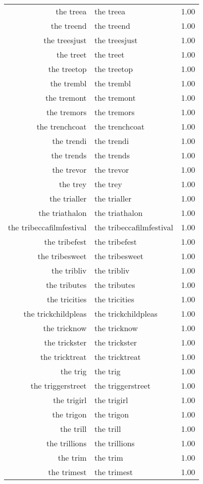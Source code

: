 \begin{table}[ht]
\begin{tabular}{rlr}
  the treea & the treea & 1.00 \\ 
  the treend & the treend & 1.00 \\ 
  the treesjust & the treesjust & 1.00 \\ 
  the treet & the treet & 1.00 \\ 
  the treetop & the treetop & 1.00 \\ 
  the trembl & the trembl & 1.00 \\ 
  the tremont & the tremont & 1.00 \\ 
  the tremors & the tremors & 1.00 \\ 
  the trenchcoat & the trenchcoat & 1.00 \\ 
  the trendi & the trendi & 1.00 \\ 
  the trends & the trends & 1.00 \\ 
  the trevor & the trevor & 1.00 \\ 
  the trey & the trey & 1.00 \\ 
  the trialler & the trialler & 1.00 \\ 
  the triathalon & the triathalon & 1.00 \\ 
  the tribeccafilmfestival & the tribeccafilmfestival & 1.00 \\ 
  the tribefest & the tribefest & 1.00 \\ 
  the tribesweet & the tribesweet & 1.00 \\ 
  the tribliv & the tribliv & 1.00 \\ 
  the tributes & the tributes & 1.00 \\ 
  the tricities & the tricities & 1.00 \\ 
  the trickchildpleas & the trickchildpleas & 1.00 \\ 
  the tricknow & the tricknow & 1.00 \\ 
  the trickster & the trickster & 1.00 \\ 
  the tricktreat & the tricktreat & 1.00 \\ 
  the trig & the trig & 1.00 \\ 
  the triggerstreet & the triggerstreet & 1.00 \\ 
  the trigirl & the trigirl & 1.00 \\ 
  the trigon & the trigon & 1.00 \\ 
  the trill & the trill & 1.00 \\ 
  the trillions & the trillions & 1.00 \\ 
  the trim & the trim & 1.00 \\ 
  the trimest & the trimest & 1.00 \\ 

\end{tabular}
\end{table}
